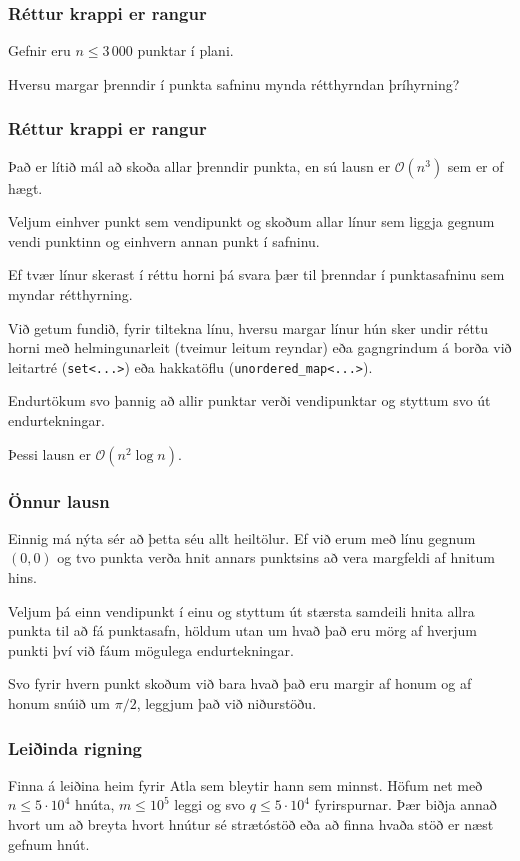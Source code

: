 {
	\frametitle{Réttur krappi er rangur}
	{
		\item<1-> Gefnir eru $n \leq 3\, 000$ punktar í plani.
		\item<2-> Hversu margar þrenndir í punkta safninu mynda rétthyrndan þríhyrning?
	}
}

{
	\frametitle{Réttur krappi er rangur}
	{
		\item<1-> Það er lítið mál að skoða allar þrenndir punkta, en sú lausn er $\mathcal{O}(n^3)$ sem er of hægt.
		\item<2-> Veljum einhver punkt sem vendipunkt og skoðum allar línur sem liggja gegnum vendi punktinn og einhvern annan punkt í safninu.
		\item<3-> Ef tvær línur skerast í réttu horni þá svara þær til þrenndar í punktasafninu sem myndar rétthyrning.
		\item<4-> Við getum fundið, fyrir tiltekna línu, hversu margar línur hún sker undir réttu horni með helmingunarleit (tveimur leitum reyndar)
					eða gagngrindum á borða við leitartré (\texttt{set<...>}) eða hakkatöflu (\texttt{unordered\_map<...>}).
		\item<5-> Endurtökum svo þannig að allir punktar verði vendipunktar og styttum svo út endurtekningar.
		\item<6-> Þessi lausn er $\mathcal{O}(n^2 \log n)$.
	}
}

{
    \frametitle{Önnur lausn}
    {
        \item<1-> Einnig má nýta sér að þetta séu allt heiltölur. Ef við erum með línu gegnum $(0, 0)$ og tvo punkta verða hnit annars punktsins
            að vera margfeldi af hnitum hins. 
        \item<2-> Veljum þá einn vendipunkt í einu og styttum út stærsta samdeili hnita allra punkta til að fá punktasafn, höldum utan um hvað
            það eru mörg af hverjum punkti því við fáum mögulega endurtekningar.
        \item<3-> Svo fyrir hvern punkt skoðum við bara hvað það eru margir af honum og af honum snúið um $\pi/2$, leggjum það við niðurstöðu.
    }
}

{
	\frametitle{Leiðinda rigning}
	{
		\item<1-> Finna á leiðina heim fyrir Atla sem bleytir hann sem minnst. Höfum net með $n \leq 5 \cdot 10^4$ hnúta, $m \leq 10^5$ leggi
            og svo $q \leq 5 \cdot 10^4$ fyrirspurnar. Þær biðja annað hvort um að breyta hvort hnútur sé strætóstöð eða að finna hvaða stöð
            er næst gefnum hnút.
	}
}

